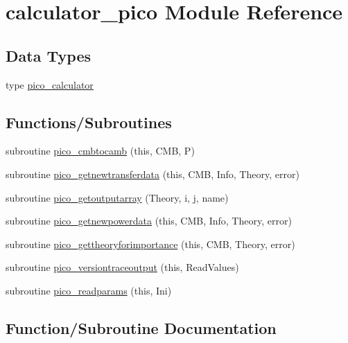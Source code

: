 \hypertarget{namespacecalculator__pico}{}\section{calculator\+\_\+pico Module Reference}
\label{namespacecalculator__pico}
\subsection*{Data Types}
\begin{DoxyCompactItemize}
\item 
type \mbox{\hyperlink{structcalculator__pico_1_1pico__calculator}{pico\+\_\+calculator}}
\end{DoxyCompactItemize}
\subsection*{Functions/\+Subroutines}
\begin{DoxyCompactItemize}
\item 
subroutine \mbox{\hyperlink{namespacecalculator__pico_a3b8f1f50b300f4773dc55711f55573f6}{pico\+\_\+cmbtocamb}} (this, C\+MB, P)
\item 
subroutine \mbox{\hyperlink{namespacecalculator__pico_a76b2c99179137a67bf5deffecbe7a883}{pico\+\_\+getnewtransferdata}} (this, C\+MB, Info, Theory, error)
\item 
subroutine \mbox{\hyperlink{namespacecalculator__pico_adaa7c5af46424e51b4ff7c68520348c2}{pico\+\_\+getoutputarray}} (Theory, i, j, name)
\item 
subroutine \mbox{\hyperlink{namespacecalculator__pico_a45cf2dcc102d6d731b105dcc2b985c04}{pico\+\_\+getnewpowerdata}} (this, C\+MB, Info, Theory, error)
\item 
subroutine \mbox{\hyperlink{namespacecalculator__pico_abec990f2804cd52fd2f1c7aab45c7fe8}{pico\+\_\+gettheoryforimportance}} (this, C\+MB, Theory, error)
\item 
subroutine \mbox{\hyperlink{namespacecalculator__pico_ad5f92039b6c79eac4c4aeb00e53da084}{pico\+\_\+versiontraceoutput}} (this, Read\+Values)
\item 
subroutine \mbox{\hyperlink{namespacecalculator__pico_a974f29861363802129a96c29e70ea03e}{pico\+\_\+readparams}} (this, Ini)
\end{DoxyCompactItemize}


\subsection{Function/\+Subroutine Documentation}
\mbox{\label{namespacecalculator__pico_a3b8f1f50b300f4773dc55711f55573f6}} 
